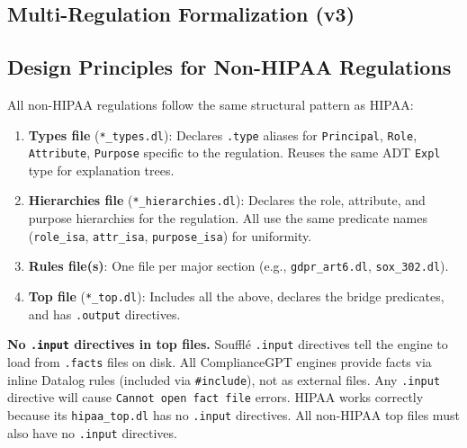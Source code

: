\documentclass[11pt,letterpaper]{article}
\begin{document}
\begin{appendices}
\section{Multi-Regulation Formalization (v3)}
\label{sec:multi-regulation}

\subsection{Design Principles for Non-HIPAA Regulations}

All non-HIPAA regulations follow the same structural pattern as HIPAA:

\begin{enumerate}
  \item \textbf{Types file} (\texttt{*\_types.dl}): Declares \texttt{.type} aliases for \texttt{Principal}, \texttt{Role}, \texttt{Attribute}, \texttt{Purpose} specific to the regulation. Reuses the same ADT \texttt{Expl} type for explanation trees.
  \item \textbf{Hierarchies file} (\texttt{*\_hierarchies.dl}): Declares the role, attribute, and purpose hierarchies for the regulation. All use the same predicate names (\texttt{role\_isa}, \texttt{attr\_isa}, \texttt{purpose\_isa}) for uniformity.
  \item \textbf{Rules file(s)}: One file per major section (e.g., \texttt{gdpr\_art6.dl}, \texttt{sox\_302.dl}).
  \item \textbf{Top file} (\texttt{*\_top.dl}): Includes all the above, declares the bridge predicates, and has \texttt{.output} directives.
\end{enumerate}

\begin{warningbox}
\textbf{No \texttt{.input} directives in top files.} Souffl\'{e} \texttt{.input} directives tell the engine to load from \texttt{.facts} files on disk. All ComplianceGPT engines provide facts via inline Datalog rules (included via \texttt{\#include}), not as external files. Any \texttt{.input} directive will cause \texttt{Cannot open fact file} errors. HIPAA works correctly because its \texttt{hipaa\_top.dl} has no \texttt{.input} directives. All non-HIPAA top files must also have no \texttt{.input} directives.
\end{warningbox}


\end{appendices}
\end{document}
